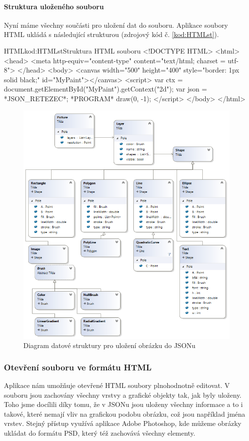 \documentclass[
  field=inf,
  biblatex=false,
  glossaries,
  index
]{kidiplom}
\begin{document}
\paragraph{Struktura uloženého souboru}
Nyní máme všechny součásti pro uložení dat do souboru. Aplikace soubory HTML ukládá s následující strukturou (zdrojový kód č. \ref{kod:HTMLst}).

\begin{kicode}{HTML}{kod:HTMLst}{Struktura HTML souboru}
<!DOCTYPE HTML>
<html>
  <head>
    <meta http-equiv="content-type" content="text/html; charset = utf-8">
  </head>
  <body>
  <canvas width="500" height="400" style="border: 1px solid black;" id="MyPaint"></canvas>
  <script>
    var ctx = document.getElementById("MyPaint").getContext("2d");
    var json = *JSON_RETEZEC*;
    *PROGRAM*
    draw(0, -1);
  </script>
  </body>
</html>
\end{kicode}


\begin{figure}
\includegraphics[width=15cm]{img/json_diag}
\caption{Diagram datové struktury pro uložení obrázku do JSONu}
\label{fig:json_diag}
\end{figure} 


\subsubsection{Otevření souboru ve formátu HTML}
Aplikace nám umožňuje otevřené HTML soubory plnohodnotně editovat. V souboru jsou zachovány všechny vrstvy a grafické objekty tak, jak byly uloženy. Toho jsme docílili díky tomu, že v JSONu jsou uloženy všechny informace a to i takové, které nemají vliv na grafickou podobu obrázku, což jsou například jména vrstev. Stejný přístup využívá aplikace Adobe Photoshop, kde můžeme obrázky ukládat do formátu PSD, který též zachovává všechny elementy.
\end{document}
